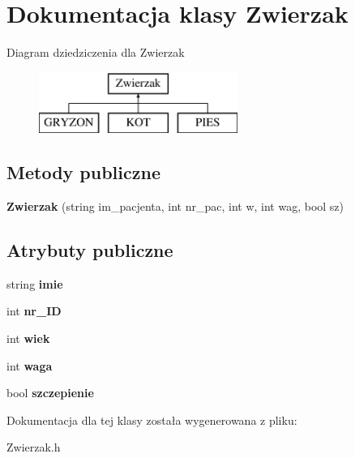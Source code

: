 \hypertarget{class_zwierzak}{}\section{Dokumentacja klasy Zwierzak}
\label{class_zwierzak}
Diagram dziedziczenia dla Zwierzak\begin{figure}[H]
\begin{center}
\leavevmode
\includegraphics[height=2.000000cm]{class_zwierzak}
\end{center}
\end{figure}
\subsection*{Metody publiczne}
\begin{DoxyCompactItemize}
\item 
{\bfseries Zwierzak} (string im\+\_\+pacjenta, int nr\+\_\+pac, int w, int wag, bool sz)\hypertarget{class_zwierzak_a60705f18b6910541acfeb6ba2fb8d049}{}\label{class_zwierzak_a60705f18b6910541acfeb6ba2fb8d049}

\end{DoxyCompactItemize}
\subsection*{Atrybuty publiczne}
\begin{DoxyCompactItemize}
\item 
string {\bfseries imie}\hypertarget{class_zwierzak_a0a32e3dccc1bbfce4e192bad8957e0eb}{}\label{class_zwierzak_a0a32e3dccc1bbfce4e192bad8957e0eb}

\item 
int {\bfseries nr\+\_\+\+ID}\hypertarget{class_zwierzak_a49ae8dd3b765af187014cdd79d554880}{}\label{class_zwierzak_a49ae8dd3b765af187014cdd79d554880}

\item 
int {\bfseries wiek}\hypertarget{class_zwierzak_ace4be3289ee2cea5aaf441233c5df999}{}\label{class_zwierzak_ace4be3289ee2cea5aaf441233c5df999}

\item 
int {\bfseries waga}\hypertarget{class_zwierzak_acd4b5b7d45ab6dbcb20810bf6d0b91ca}{}\label{class_zwierzak_acd4b5b7d45ab6dbcb20810bf6d0b91ca}

\item 
bool {\bfseries szczepienie}\hypertarget{class_zwierzak_ac77058255f281fa40fa21e81257f1104}{}\label{class_zwierzak_ac77058255f281fa40fa21e81257f1104}

\end{DoxyCompactItemize}


Dokumentacja dla tej klasy została wygenerowana z pliku\+:\begin{DoxyCompactItemize}
\item 
Zwierzak.\+h\end{DoxyCompactItemize}
